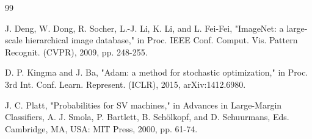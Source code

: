 \documentclass[conference,a4paper]{IEEEtran}
\begin{document}
\begin{thebibliography}{99}

J. Deng, W. Dong, R. Socher, L.-J. Li, K. Li, and L. Fei-Fei, "ImageNet: a large-scale hierarchical
image database," in Proc. IEEE Conf. Comput. Vis. Pattern Recognit. (CVPR), 2009, pp. 248-255.


D. P. Kingma and J. Ba, "Adam: a method for stochastic optimization," in Proc. 3rd Int. Conf. Learn.
Represent. (ICLR), 2015, arXiv:1412.6980.


J. C. Platt, "Probabilities for SV machines," in Advances in Large-Margin Classifiers, A. J. Smola,
P. Bartlett, B. Schölkopf, and D. Schuurmans, Eds. Cambridge, MA, USA: MIT Press, 2000, pp. 61-74.

\end{thebibliography}



\end{document}
